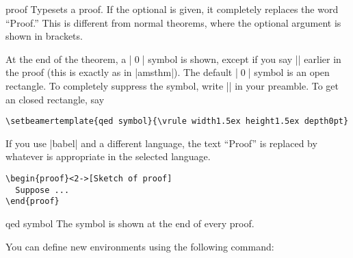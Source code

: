 \begin{environment}{{proof}}
  Typesets a proof. If the optional  is given, it completely replaces the word ``Proof.'' This is different from normal theorems, where the optional argument is shown in brackets.

  At the end of the theorem, a |\qed| symbol is shown, except if you say |\qedhere| earlier in the proof (this is exactly as in |amsthm|). The default |\qed| symbol is an open rectangle. To completely suppress the symbol, write |\def\qedsymbol{}| in your preamble. To get an closed rectangle, say
\begin{verbatim}
\setbeamertemplate{qed symbol}{\vrule width1.5ex height1.5ex depth0pt}
\end{verbatim}

  If you use |babel| and a different language, the text ``Proof'' is replaced by whatever is appropriate in the selected language.

  \example
\begin{verbatim}
\begin{proof}<2->[Sketch of proof]
  Suppose ...
\end{proof}
\end{verbatim}

  \begin{element}{qed symbol}\yes\yes\yes
    The symbol is shown at the end of every proof.
  \end{element}
\end{environment}

You can define new environments using the following command:


